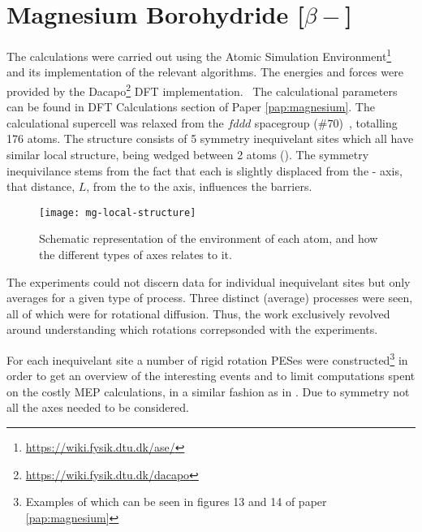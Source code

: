 \section{Magnesium Borohydride [$\beta-$]}
\label{sec:borohydrides-magnesium}

The calculations were carried out using the Atomic Simulation Environment\footnote{\url{https://wiki.fysik.dtu.dk/ase/}}~\cite{ase-2002} and its implementation of the relevant algorithms.
The energies and forces were provided by the Dacapo\footnote{\url{https://wiki.fysik.dtu.dk/dacapo}} DFT implementation.~\cite{dacapo-1999}
The calculational parameters can be found in DFT Calculations section of Paper \ref{pap:magnesium}.
The calculational supercell was relaxed from the $fddd$ spacegroup ($\#70$)~\cite{mgbh42-structure-fddd}, totalling 176 atoms.
The structure consists of 5 symmetry inequivelant  sites which all have similar local structure, being wedged between 2  atoms ().
The symmetry inequivilance stems from the fact that each  is slightly displaced from the - axis, that distance, $L$, from the  to the axis, influences the barriers.

\begin{figure}
\begin{center}
    \texttt{[image: mg-local-structure]}
    \parbox{0.85\linewidth}{
\caption{Schematic representation of the environment of each  atom, and how the different types of axes relates to it.
}
\label{fig:mg-local-structure}
}
\end{center}
\end{figure}

The experiments could not discern data for individual inequivelant sites but only averages for a given type of process.
Three distinct (average) processes were seen, all of which were for rotational diffusion.
Thus, the work exclusively revolved around understanding which rotations correpsonded with the experiments.

For each inequivelant site a number of rigid rotation PESes were constructed\footnote{Examples of which can be seen in figures 13 and 14 of paper \ref{pap:magnesium}} in order to get an overview of the interesting events and to limit computations spent on the costly MEP calculations, in a similar fashion as in .
Due to symmetry not all the axes needed to be considered.

